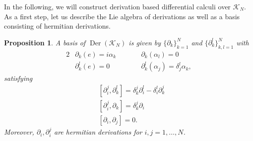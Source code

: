 \documentclass{amsart}
\newtheorem{proposition}[theorem]{Proposition}
\theoremstyle{definition}
\theoremstyle{remark}
\numberwithin{equation}{section}
\newcommand{\K}{\mathcal{K}}
\newcommand{\KN}{\K_N}
\renewcommand{\d}{\partial}
\newcommand{\Der}{\operatorname{Der}}
\begin{document}
\noindent
In the following, we will construct derivation based differential
calculi over $\KN$. As a first step, let us describe the Lie algebra
of derivations as well as a basis consisting of hermitian derivations.

\begin{proposition}\label{prop:derivations}
  A basis of $\Der(\KN)$ is given by $\{\d_k\}_{k=1}^N$ and $\{\d_k^l\}_{k,l=1}^N$ with
  \begin{alignat}{2}
    &\d_k(e) = i\alpha_k &\qquad &\d_k(\alpha_l) = 0\label{eq:di.def}\\
    &\d_k^l(e)=0 &\qquad &\d_{k}^l(\alpha_j) =\delta_j^l\alpha_k,\label{eq:dij.def}
  \end{alignat}
  satisfying
  \begin{align*}
    &[\d_{i}^j,\d_{k}^l] = \delta_{k}^j\d_{i}^l-\delta_{i}^l\d_{k}^j\\
    &[\d_{i}^j,\d_k] = \delta_{k}^j\d_i\\
    &[\d_i,\d_j] = 0.
  \end{align*}
  Moreover, $\d_i,\d_i^j$ are hermitian derivations for $i,j=1,\ldots,N$.
\end{proposition}
\end{document}
